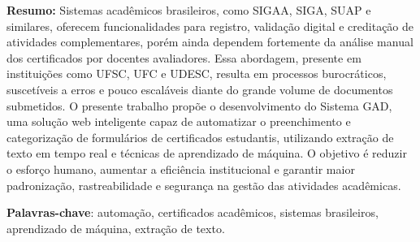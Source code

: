 \begin{resumo}


\textbf{Resumo:} Sistemas acadêmicos brasileiros, como SIGAA, SIGA, SUAP e similares, oferecem funcionalidades para registro, validação digital e creditação de atividades complementares, porém ainda dependem fortemente da análise manual dos certificados por docentes avaliadores. Essa abordagem, presente em instituições como UFSC, UFC e UDESC, resulta em processos burocráticos, suscetíveis a erros e pouco escaláveis diante do grande volume de documentos submetidos. O presente trabalho propõe o desenvolvimento do Sistema GAD, uma solução web inteligente capaz de automatizar o preenchimento e categorização de formulários de certificados estudantis, utilizando extração de texto em tempo real e técnicas de aprendizado de máquina. O objetivo é reduzir o esforço humano, aumentar a eficiência institucional e garantir maior padronização, rastreabilidade e segurança na gestão das atividades acadêmicas.

\vspace{\onelineskip}

\textbf{Palavras-chave}: automação, certificados acadêmicos, sistemas brasileiros, aprendizado de máquina, extração de texto.

\end{resumo}